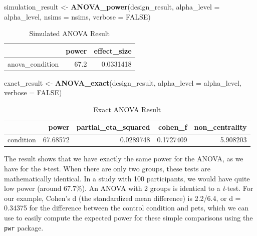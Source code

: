 \documentclass[
]{book}
\newenvironment{Shaded}{\begin{snugshade}}{\end{snugshade}}
\newcommand{\DataTypeTok}[1]{\textcolor[rgb]{0.13,0.29,0.53}{#1}}
\newcommand{\KeywordTok}[1]{\textcolor[rgb]{0.13,0.29,0.53}{\textbf{#1}}}
\newcommand{\NormalTok}[1]{#1}
\newcommand{\OtherTok}[1]{\textcolor[rgb]{0.56,0.35,0.01}{#1}}
\newcommand{\StringTok}[1]{\textcolor[rgb]{0.31,0.60,0.02}{#1}}
\begin{document}
\begin{Shaded}
\begin{Highlighting}[]
\NormalTok{simulation_result <-}\StringTok{ }\KeywordTok{ANOVA_power}\NormalTok{(design_result, }
                                 \DataTypeTok{alpha_level =}\NormalTok{ alpha_level, }
                                 \DataTypeTok{nsims =}\NormalTok{ nsims,}
                                 \DataTypeTok{verbose =} \OtherTok{FALSE}\NormalTok{)}
\end{Highlighting}
\end{Shaded}

\begin{table}[!h]

\caption{\label{tab:unnamed-chunk-11}Simulated ANOVA Result}
\centering
\begin{tabular}[t]{l|r|r}
\hline
  & power & effect\_size\\
\hline
anova\_condition & 67.2 & 0.0331418\\
\hline
\end{tabular}
\end{table}

\begin{Shaded}
\begin{Highlighting}[]
\NormalTok{exact_result <-}\StringTok{ }\KeywordTok{ANOVA_exact}\NormalTok{(design_result,}
                            \DataTypeTok{alpha_level =}\NormalTok{ alpha_level,}
                            \DataTypeTok{verbose =} \OtherTok{FALSE}\NormalTok{)}
\end{Highlighting}
\end{Shaded}

\begin{table}[!h]

\caption{\label{tab:unnamed-chunk-13}Exact ANOVA Result}
\centering
\begin{tabular}[t]{l|r|r|r|r}
\hline
  & power & partial\_eta\_squared & cohen\_f & non\_centrality\\
\hline
condition & 67.68572 & 0.0289748 & 0.1727409 & 5.908203\\
\hline
\end{tabular}
\end{table}

The result shows that we have exactly the same power for the ANOVA, as we have for the \emph{t}-test. When there are only two groups, these tests are mathematically identical. In a study with 100 participants, we would have quite low power (around 67.7\%). An ANOVA with 2 groups is identical to a \emph{t}-test. For our example, Cohen's d (the standardized mean difference) is 2.2/6.4, or d = 0.34375 for the difference between the control condition and pets, which we can use to easily compute the expected power for these simple comparisons using the \texttt{pwr} \citeyearpar{R-pwr} package.
\end{document}
